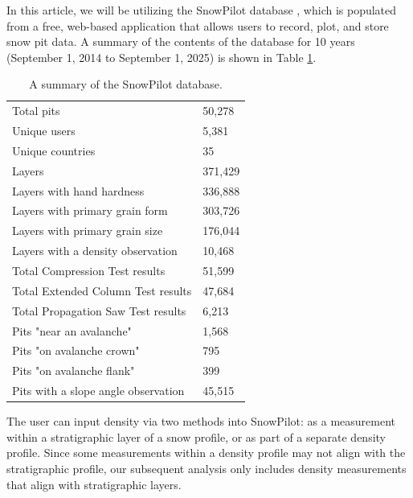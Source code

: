 \documentclass[journal abbreviation, manuscript]{copernicus}
\begin{document}
In this article, we will be utilizing the SnowPilot database \citep{chabot2004,chabot2016}, which is populated from a free, web-based application that allows users to record, plot, and store snow pit data. A summary of the contents of the database for 10 years (September 1, 2014 to September 1, 2025) is shown in Table \ref{tab:snowpilot}.


\begin{table}[]
\begin{threeparttable}
\caption{A summary of the SnowPilot database.}
\label{tab:snowpilot}
\begin{tabular}{ll}
Total pits                     &  50,278\\
Unique users                   &  5,381\\
Unique countries               &  35\\
Layers                         &  371,429\\
Layers with hand hardness      &  336,888\\
Layers with primary grain form &  303,726\\
Layers with primary grain size &  176,044\\
Layers with a density observation\tnote{a}&  10,468\\
Total Compression Test results&  51,599\\
Total Extended Column Test results&  47,684\\
Total Propagation Saw Test results&  6,213\\
Pits "near an avalanche"&  1,568\\
Pits "on avalanche crown"&  795\\
Pits "on avalanche flank"&  399\\
Pits with a slope angle observation&
45,515\end{tabular}
\begin{tablenotes}
\footnotesize
\item[a] The user can input density via two methods into SnowPilot: as a measurement within a stratigraphic layer of a snow profile, or as part of a separate density profile. 
Since some measurements within a density profile may not align with the stratigraphic profile, our subsequent analysis only includes density measurements that align with stratigraphic layers. 

\end{tablenotes}
\end{threeparttable}
\end{table}
\end{document}
